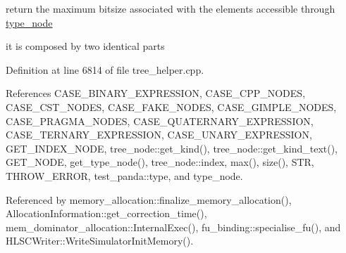 return the maximum bitsize associated with the elements accessible through \hyperlink{structtype__node}{type\+\_\+node} 

it is composed by two identical parts 

Definition at line 6814 of file tree\+\_\+helper.\+cpp.



References C\+A\+S\+E\+\_\+\+B\+I\+N\+A\+R\+Y\+\_\+\+E\+X\+P\+R\+E\+S\+S\+I\+ON, C\+A\+S\+E\+\_\+\+C\+P\+P\+\_\+\+N\+O\+D\+ES, C\+A\+S\+E\+\_\+\+C\+S\+T\+\_\+\+N\+O\+D\+ES, C\+A\+S\+E\+\_\+\+F\+A\+K\+E\+\_\+\+N\+O\+D\+ES, C\+A\+S\+E\+\_\+\+G\+I\+M\+P\+L\+E\+\_\+\+N\+O\+D\+ES, C\+A\+S\+E\+\_\+\+P\+R\+A\+G\+M\+A\+\_\+\+N\+O\+D\+ES, C\+A\+S\+E\+\_\+\+Q\+U\+A\+T\+E\+R\+N\+A\+R\+Y\+\_\+\+E\+X\+P\+R\+E\+S\+S\+I\+ON, C\+A\+S\+E\+\_\+\+T\+E\+R\+N\+A\+R\+Y\+\_\+\+E\+X\+P\+R\+E\+S\+S\+I\+ON, C\+A\+S\+E\+\_\+\+U\+N\+A\+R\+Y\+\_\+\+E\+X\+P\+R\+E\+S\+S\+I\+ON, G\+E\+T\+\_\+\+I\+N\+D\+E\+X\+\_\+\+N\+O\+DE, tree\+\_\+node\+::get\+\_\+kind(), tree\+\_\+node\+::get\+\_\+kind\+\_\+text(), G\+E\+T\+\_\+\+N\+O\+DE, get\+\_\+type\+\_\+node(), tree\+\_\+node\+::index, max(), size(), S\+TR, T\+H\+R\+O\+W\+\_\+\+E\+R\+R\+OR, test\+\_\+panda\+::type, and type\+\_\+node.



Referenced by memory\+\_\+allocation\+::finalize\+\_\+memory\+\_\+allocation(), Allocation\+Information\+::get\+\_\+correction\+\_\+time(), mem\+\_\+dominator\+\_\+allocation\+::\+Internal\+Exec(), fu\+\_\+binding\+::specialise\+\_\+fu(), and H\+L\+S\+C\+Writer\+::\+Write\+Simulator\+Init\+Memory().

